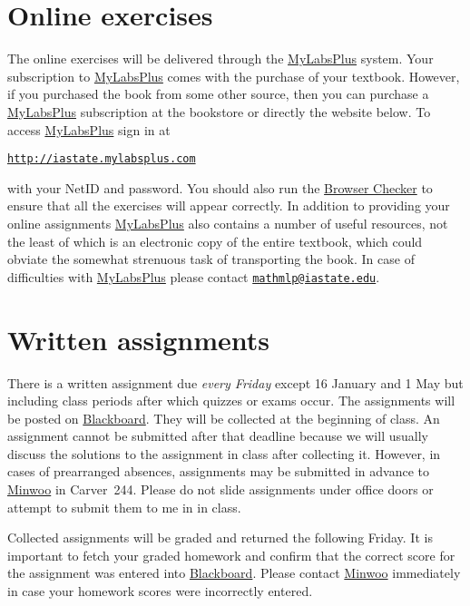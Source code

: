 \documentclass[11pt]{article}
\begin{document}
\section{Online exercises}\label{Online}
The online exercises will be delivered through the
\href{http://iastate.mylabsplus.com}{MyLabsPlus} system.
Your subscription to 
\href{http://iastate.mylabsplus.com}{MyLabsPlus}
comes with the purchase of your textbook.
However, if you purchased the book from some other source,
then you can purchase a 
\href{http://iastate.mylabsplus.com}{MyLabsPlus}
subscription at the bookstore or directly the website below.
To access
\href{http://iastate.mylabsplus.com}{MyLabsPlus}
sign in at
\begin{center}
\href{http://iastate.mylabsplus.com}{\tt http://iastate.mylabsplus.com}
\end{center}
with your NetID and password.
You should also run the
\href{https://www.mathxl.com/BrowserCheck/BrowserCheck.aspx?appproductid=3&courseid=2744761&handler_urn=pearson%2fmlp_mml_xl%2fslink%2fx-pearson-mlp_mml_xl&productid=ccng}{Browser Checker}
to ensure that all the exercises will appear correctly.
In addition to providing your online assignments
\href{http://iastate.mylabsplus.com}{MyLabsPlus}
also contains a number of useful resources, not the least of which is an
electronic copy of the entire textbook, which could obviate
the somewhat strenuous task of transporting the book.
In case of difficulties
with \href{http://iastate.mylabsplus.com}{MyLabsPlus} please contact
\href{mailto://mathmlp@iastate.edu}{\tt mathmlp@iastate.edu}.

\section{Written assignments}\label{Written}
There is a written assignment due {\em every 
Friday} except 16 January and 1 May
but including class periods
after which quizzes or exams occur.
The assignments will be posted on \href{https://bb.its.iastate.edu}{Blackboard}.
They will be collected at the beginning
of class. An assignment cannot be submitted after that deadline
because we will usually discuss the solutions to the assignment
in class after collecting it.
However, in cases of prearranged absences, assignments may be submitted
in advance to \href{mailto:mws@iastate.edu}{Minwoo} in Carver~244.
Please do not slide assignments under office doors or attempt
to submit them to me in in class.

Collected assignments will be graded and returned the following Friday.
It is important to fetch your graded homework and confirm that the correct
score for the assignment was entered into
\href{https://bb.its.iastate.edu}{Blackboard}. Please contact
\href{mailto:mws@iastate.edu}{Minwoo} immediately in case your homework scores
were incorrectly entered.
\end{document}

